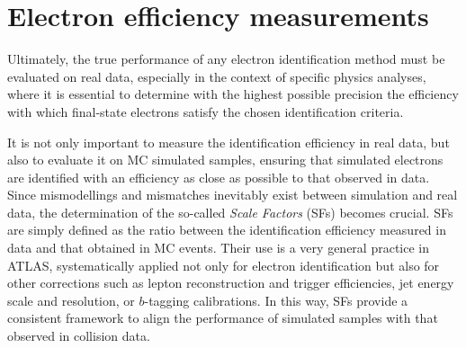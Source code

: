 \section{Electron efficiency measurements}
\label{sec:electron_efficiency_measurements}

Ultimately, the true performance of any electron identification method must be evaluated on real data, especially in the context of specific physics analyses, where it is essential to determine with the highest possible precision the efficiency with which final-state electrons satisfy the chosen identification criteria.  

It is not only important to measure the identification efficiency in real data, but also to evaluate it on MC simulated samples, ensuring that simulated electrons are identified with an efficiency as close as possible to that observed in data. Since mismodellings and mismatches inevitably exist between simulation and real data, the determination of the so-called \emph{Scale Factors} (SFs) becomes crucial. SFs are simply defined as the ratio between the identification efficiency measured in data and that obtained in MC events. Their use is a very general practice in ATLAS, systematically applied not only for electron identification but also for other corrections such as lepton reconstruction and trigger efficiencies, jet energy scale and resolution, or $b$-tagging calibrations. In this way, SFs provide a consistent framework to align the performance of simulated samples with that observed in collision data.

